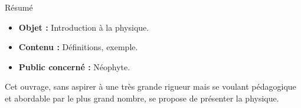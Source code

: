 \begin{center}
\Large
Résumé
\normalsize
\end{center}
\vspace{3cm}
\begin{itemize}[leftmargin=1cm, label=, itemsep=21pt]
\item {\bf Objet : } Introduction à la physique.
\item {\bf Contenu : } Définitions, exemple.
\item {\bf Public concerné : } Néophyte.
\end{itemize}

\vspace{3cm}

Cet ouvrage, sans aspirer à une très grande rigueur mais se voulant pédagogique et abordable par le plus grand nombre, se propose de présenter la physique.



\begin{itemize}[leftmargin=1cm, label=, itemsep=2pt]
\end{itemize}


